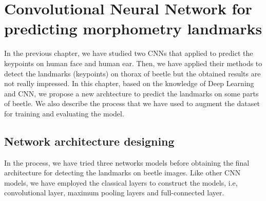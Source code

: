 \chapter{Convolutional Neural Network for predicting morphometry landmarks}
In the previous chapter, we have studied two CNNs \cite{sun2013deep, cintas2016automatic} that applied to predict the keypoints on human face and human ear. Then, we have applied their methods to detect the landmarks (keypoints) on thorax of beetle but the obtained results are not really impressed. In this chapter, based on the knowledge of Deep Learning and CNN, we propose a new archtecture to predict the landmarks on some parts of beetle. We also describe the process that we have used to augment the dataset for training and evaluating the model.

\section{Network architecture designing}
In the process, we have tried three networks models before obtaining the final architecture for detecting the landmarks on beetle images. Like other CNN models, we have employed the classical layers to construct the models, i.e, convolutional layer, maximum pooling layers and full-connected layer.

